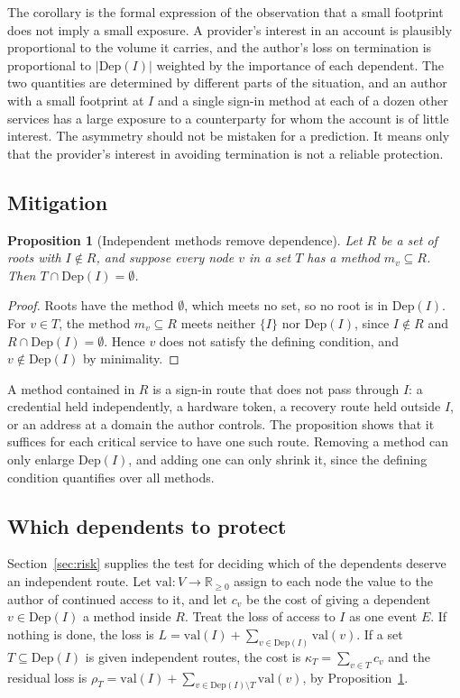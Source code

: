 \documentclass[11pt]{article}
\theoremstyle{plain}
\newtheorem{proposition}[theorem]{Proposition}
\theoremstyle{definition}
\theoremstyle{remark}
\newcommand{\R}{\mathbb{R}}
\begin{document}
The corollary is the formal expression of the observation that a small footprint does not imply a small exposure. A provider's interest in an account is plausibly proportional to the volume it carries, and the author's loss on termination is proportional to $|\mathrm{Dep}(I)|$ weighted by the importance of each dependent. The two quantities are determined by different parts of the situation, and an author with a small footprint at $I$ and a single sign-in method at each of a dozen other services has a large exposure to a counterparty for whom the account is of little interest. The asymmetry should not be mistaken for a prediction. It means only that the provider's interest in avoiding termination is not a reliable protection.

\subsection{Mitigation}

\begin{proposition}[Independent methods remove dependence]\label{prop:indep}
Let $R$ be a set of roots with $I\notin R$, and suppose every node $v$ in a set $T$ has a method $m_v\subseteq R$. Then $T\cap\mathrm{Dep}(I)=\emptyset$.
\end{proposition}

\begin{proof}
Roots have the method $\emptyset$, which meets no set, so no root is in $\mathrm{Dep}(I)$. For $v\in T$, the method $m_v\subseteq R$ meets neither $\{I\}$ nor $\mathrm{Dep}(I)$, since $I\notin R$ and $R\cap\mathrm{Dep}(I)=\emptyset$. Hence $v$ does not satisfy the defining condition, and $v\notin\mathrm{Dep}(I)$ by minimality. \qedhere
\end{proof}

A method contained in $R$ is a sign-in route that does not pass through $I$: a credential held independently, a hardware token, a recovery route held outside $I$, or an address at a domain the author controls. The proposition shows that it suffices for each critical service to have one such route. Removing a method can only enlarge $\mathrm{Dep}(I)$, and adding one can only shrink it, since the defining condition quantifies over all methods.

\subsection{Which dependents to protect}

Section~\ref{sec:risk} supplies the test for deciding which of the dependents deserve an independent route. Let $\mathrm{val}:V\to\R_{\ge0}$ assign to each node the value to the author of continued access to it, and let $c_v$ be the cost of giving a dependent $v\in\mathrm{Dep}(I)$ a method inside $R$. Treat the loss of access to $I$ as one event $E$. If nothing is done, the loss is $L=\mathrm{val}(I)+\sum_{v\in\mathrm{Dep}(I)}\mathrm{val}(v)$. If a set $T\subseteq\mathrm{Dep}(I)$ is given independent routes, the cost is $\kappa_T=\sum_{v\in T}c_v$ and the residual loss is $\rho_T=\mathrm{val}(I)+\sum_{v\in\mathrm{Dep}(I)\setminus T}\mathrm{val}(v)$, by Proposition~\ref{prop:indep}.
\end{document}
